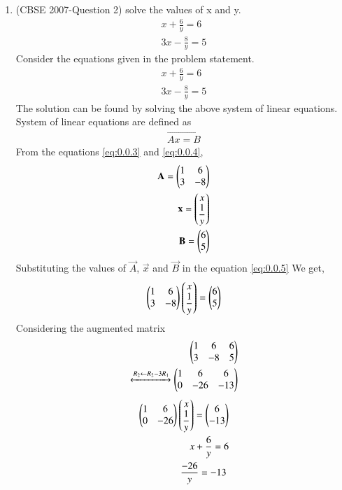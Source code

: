 \documentclass[journal,12pt,twocolumn]{IEEEtran}
\begin{document}
\begin{enumerate}
\item (CBSE 2007-Question 2)
solve the values of x and y.
\begin{align}
x+\displaystyle\frac{6}{y}=6  \\ 
3x-\displaystyle\frac{8}{y}=5
\end{align}
\solution Consider the equations  given in the problem statement.
\begin{align}
x+\displaystyle\frac{6}{y}=6 \label{eq:0.0.3}\\
3x-\displaystyle\frac{8}{y}=5 \label{eq:0.0.4}
\end{align}
The solution can be found by solving the above system of linear equations.\\ 
System of linear equations are defined as 
\begin{align}
\vec{Ax=B}\label{eq:0.0.5}
\end{align}
From the equations \eqref{eq:0.0.3} and \eqref{eq:0.0.4}, 
\begin{align}
\vec{A}= \myvec{1 &6\\3  & -8}\\
\medskip
\vec{x}= \myvec{ x\\ \displaystyle\frac{1}{y}}\\
\medskip
\vec{B}= \myvec{6\\5}  
\end{align} 
Substituting the values of $\vec{A}$, $\vec{x}$ and $\vec{B}$ in the equation \eqref{eq:0.0.5}
We get,
\begin{align}
\begin{pmatrix}1&6\\3&-8\end{pmatrix} \begin{pmatrix}x\\\displaystyle\frac{1}{y}\end{pmatrix}= \begin{pmatrix}6\\5\end{pmatrix}
\end{align}
Considering the augmented matrix 
 \begin{align}
  \begin{pmatrix}1&6&6\\3&-8&5\end{pmatrix}\\ 
 \xleftrightarrow[]{ R_2 \leftarrow R_2 - 3R_1}
  \begin{pmatrix}1&6&6\\0&-26&-13\end{pmatrix}
 \end{align}
 \begin{align}
\myvec{1&6\\0&-26} \myvec{x\\\displaystyle\frac{1}{y}}= \myvec{6\\-13}\\
\medskip
x+\displaystyle\frac{6}{y}= 6 \label{eq:0.0.13}\\\
\medskip
\displaystyle\frac{-26}{y}=-13 \label{eq:0.0.14}\

\end{align}
\end{enumerate}
\end{document}
